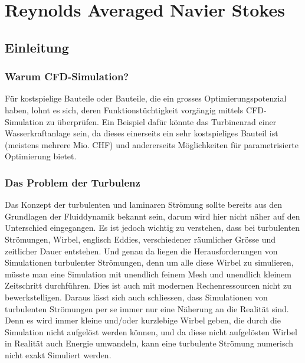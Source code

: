 %
%
%
%
\chapter{Reynolds Averaged Navier Stokes \label{chapter:reynolds}}
\begin{refsection}

\section{Einleitung}

\subsection{Warum CFD-Simulation?}

Für kostspielige Bauteile oder Bauteile, die ein grosses Optimierungspotenzial haben,
lohnt es sich, deren Funktionstüchtigkeit vorgängig mittels CFD-Simulation zu überprüfen.
Ein Beispiel dafür könnte das Turbinenrad einer Wasserkraftanlage sein,
da dieses einerseits ein sehr kostspieliges Bauteil ist (meistens mehrere Mio. CHF)
und andererseits Möglichkeiten für parametrisierte Optimierung bietet.

\subsection{Das Problem der Turbulenz}

Das Konzept der turbulenten und laminaren Strömung sollte bereits aus den Grundlagen der Fluiddynamik bekannt sein,
darum wird hier nicht näher auf den Unterschied eingegangen.
Es ist jedoch wichtig zu verstehen, dass bei turbulenten Strömungen, Wirbel, englisch Eddies, verschiedener räumlicher Grösse
und zeitlicher Dauer entstehen.
Und genau da liegen die Herausforderungen von Simulationen turbulenter Strömungen,
denn um alle diese Wirbel zu simulieren, müsste man eine Simulation mit unendlich feinem Mesh und unendlich kleinem Zeitschritt durchführen.
Dies ist auch mit modernen Rechenressourcen nicht zu bewerkstelligen.
Daraus lässt sich auch schliessen, dass Simulationen von turbulenten Strömungen per se immer nur eine Näherung an die Realität sind.
Denn es wird immer kleine und/oder kurzlebige Wirbel geben, die durch die Simulation nicht aufgelöst werden können,
und da diese nicht aufgelösten Wirbel in Realität auch Energie umwandeln, kann eine turbulente Strömung numerisch nicht exakt Simuliert werden.



\end{refsection}
